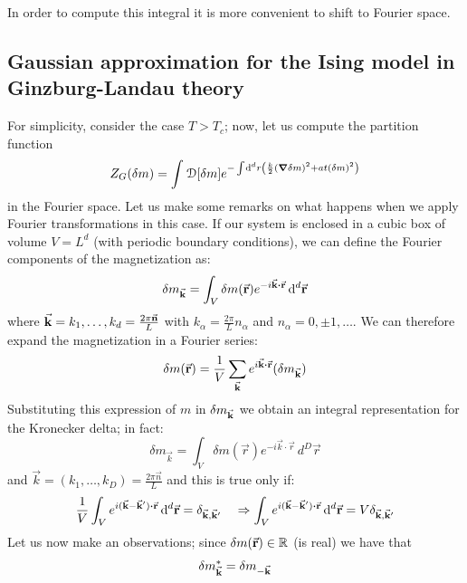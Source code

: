 \documentclass[../../Main/Main.tex]{subfiles}
\begin{document}
In order to compute this integral it is more convenient to shift to Fourier space.




\subsection{Gaussian approximation for the Ising model in Ginzburg-Landau theory}
For simplicity, consider the case \( T>T_c \); now, let us compute the partition function
\begin{equation}
  Z_{G} (\delta m) = \int_{}^{} \mathcal{D} \qty[\delta m] e^{- \int_{}^{} \dd[d]{r} \qty(\frac{k}{2} \qty(\grad \delta m)^2 + a t (\delta m)^2  )  }
 \end{equation}
 in the Fourier space.
 Let us make some remarks on what happens when we apply Fourier transformations in this case. If our system is enclosed in a cubic box of volume \( V = L^d \) (with periodic boundary conditions), we can define the Fourier components of the magnetization as:
 \begin{equation}
   \delta m_{\va{k}} = \int_{V}^{}  \delta m (\va{r}) e^{-i \va{k} \vdot \va{r} }\dd[d]{\va{r}}
 \end{equation}
 where \( \va{k} = k_1, \dots, k_d = \frac{2 \pi  \va{n} }{L}\) with \( k_ \alpha = \frac{2 \pi }{L} n_ \alpha  \) and \( n_ \alpha  = 0 , \pm 1, \dots \). We can therefore expand the magnetization in a Fourier series:
 \begin{equation}
   \delta m (\va{r}) = \frac{1}{V} \sum_{\va{k}}  e^{i \va{k}\vdot \va{r}} (\delta m_{\va{k}})
 \end{equation}
 Substituting this expression of \( m \) in \( \delta m_{\va{k}} \) we obtain an integral representation for the Kronecker delta; in fact:
$$\delta m_{\vec{k}} = \int_{V} \delta m(\vec{r}) e^{-i\vec{k}\cdot \vec{r}} \, d^{D}\vec{r} $$
and $\vec{k} = (k_{1},\dots,k_{D}) = \frac{2\pi \vec{n}}{L}$
and this is true only if:
\begin{equation*}
  \frac{1}{V} \int_{V}^{} e^{i(\va{k}-\va{k}')\vdot \va{r}} \dd[d]{\va{r}} = \delta _{\va{k},\va{k}'} \quad \Rightarrow   \int_{V}^{} e^{i(\va{k}-\va{k}')\vdot \va{r}} \dd[d]{\va{r}} = V \delta _{\va{k},\va{k}'}
\end{equation*}
Let us now make an observations; since \( \delta m (\va{r}) \in \mathbb{R} \) (is real) we have that
\begin{equation*}
  \delta m^*_{\va{k}} =  \delta m_{-\va{k}}
\end{equation*}
\end{document}
